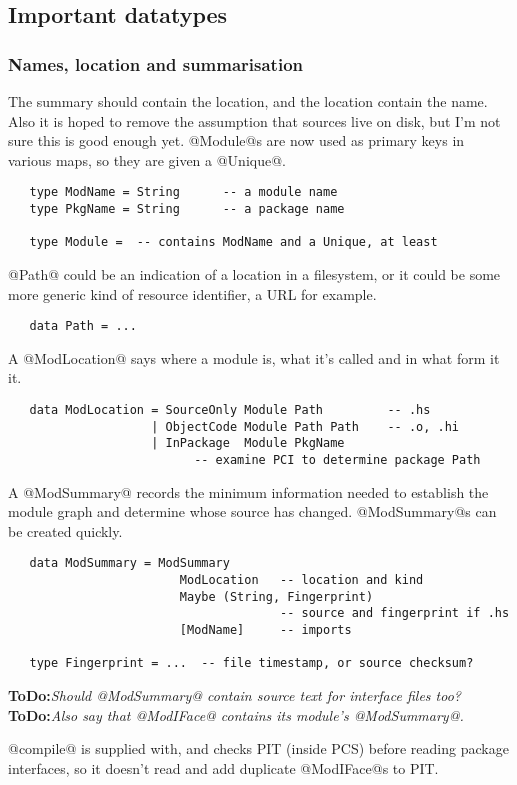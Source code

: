 \documentclass[11pt]{article}
\newcommand{\ToDo}[1]{{{\bf ToDo:}\sl #1}}
\begin{document}
\subsection{Important datatypes}

\subsubsection*{Names, location and summarisation}
The summary should contain the location, and the location contain the
name.  Also it is hoped to remove the assumption that sources live on
disk, but I'm not sure this is good enough yet.  @Module@s are now
used as primary keys in various maps, so they are given a @Unique@.
\begin{verbatim}
   type ModName = String      -- a module name
   type PkgName = String      -- a package name

   type Module =  -- contains ModName and a Unique, at least
\end{verbatim}
@Path@ could be an indication of a location in a filesystem, or it
could be some more generic kind of resource identifier, a URL for
example.
\begin{verbatim}
   data Path = ...
\end{verbatim}
A @ModLocation@ says where a module is, what it's called and in what
form it it.
\begin{verbatim}
   data ModLocation = SourceOnly Module Path         -- .hs
                    | ObjectCode Module Path Path    -- .o, .hi
                    | InPackage  Module PkgName
                          -- examine PCI to determine package Path
\end{verbatim}
A @ModSummary@ records the minimum information needed to establish the
module graph and determine whose source has changed.  @ModSummary@s
can be created quickly.
\begin{verbatim}
   data ModSummary = ModSummary 
                        ModLocation   -- location and kind
                        Maybe (String, Fingerprint)
                                      -- source and fingerprint if .hs
                        [ModName]     -- imports

   type Fingerprint = ...  -- file timestamp, or source checksum?
\end{verbatim}
\ToDo{Should @ModSummary@ contain source text for interface files
      too?}
\ToDo{Also say that @ModIFace@ contains its module's @ModSummary@.}

@compile@ is supplied with, and checks PIT (inside PCS) before
reading package interfaces, so it doesn't read and add duplicate
@ModIFace@s to PIT.
\end{document}
